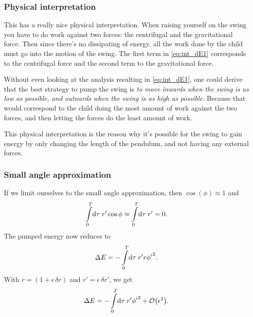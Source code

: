 \documentclass[11pt,letter, swedish, english
]{article}
\begin{document}

\newpage{}

\subsubsection*{Physical interpretation}
This has a really nice physical interpretation. When raising yourself
on the swing you have to do work against two forces:
the centrifugal and the gravitational force. Then since there's no
dissipating of energy, all the work done by the child must go into the
motion of the swing. 
The first term in \eqref{eq:int_dE1} corresponds to the centrifugal
force and the second term to the gravitational force.\footnotemark{} 


Without even looking at the analysis resulting in \eqref{eq:int_dE1},
one could derive that the best strategy to pump the swing is \emph{to move
inwards when the swing is as low as possible, and outwards when the
swing is as high as possible}. Because that would correspond to the
child doing the most amount of work against the two forces, and then
letting the forces do the least amount of work.


This physical interpretation is the reason why it's possible for the
swing to gain energy by only changing the length of the pendulum, and
not having any external forces. 

\subsubsection*{Small angle approximation}
If we limit ourselves to the small angle approximation, then
$\cos(\phi)\approx1$ and 
\begin{equation}
\int_0^T\!\rd\tau\;r'\cos\phi
\approx\int_0^T\!\rd\tau\;r'=0.
\end{equation}
The pumped energy now reduces to
\begin{equation}
\Delta{E}=-\int_0^T\!\rd\tau\;
r'r{\phi'}^2.
\end{equation}
With $r=(1+\epsilon\,\delta{r})$ and $r'=\epsilon\,\delta{r'}$, we get
\begin{equation}\label{eq:int_dE2}
\Delta{E}=-\int_0^T\!\rd\tau\;r'{\phi'}^2
+\order{\epsilon^2}.
\end{equation}
\end{document}

